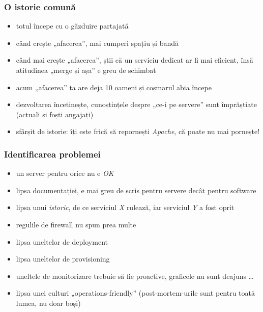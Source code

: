 \documentclass[compress]{beamer}
\begin{document}
\begin{frame}
\frametitle{O istorie comună}

\begin{itemize}[<+->]
  \item totul începe cu o găzduire partajată
  \item când crește „afacerea”, mai cumperi spațiu și bandă
  \item când mai crește „afacerea”, știi că un serviciu dedicat ar fi mai eficient, însă atitudinea „merge și așa” e greu de schimbat
  \item acum „afacerea” ta are deja 10 oameni și coșmarul abia începe
  \item dezvoltarea încetinește, cunoștințele despre „ce-i pe servere” sunt împrăștiate (actuali și foști angajați)
  \item sfârșit de istorie: îți este frică să repornești \emph{Apache}, că poate nu mai pornește!
\end{itemize}
\end{frame}

\begin{frame}
\frametitle{Identificarea problemei}

\begin{itemize}[<+->]
  \item un server pentru orice nu e \emph{OK}
  \item lipsa documentației, e mai greu de scris pentru servere decât pentru software
  \item lipsa unui \emph{istoric}, de ce serviciul \emph{X} rulează, iar serviciul \emph{Y} a fost oprit
  \item regulile de firewall nu spun prea multe
  \item lipsa uneltelor de deployment
  \item lipsa uneltelor de provisioning
  \item uneltele de monitorizare trebuie să fie proactive, graficele nu sunt deajuns \ldots
  \item lipsa unei culturi „operations-friendly” (post-mortem-urile sunt pentru toată lumea, nu doar boși)
\end{itemize}
\end{frame}
\end{document}
